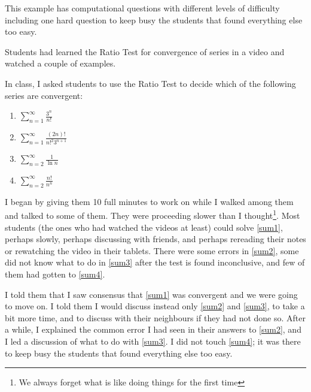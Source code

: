 \documentclass[11pt]{article}
\begin{document}
	\begin{example}
		This example has computational questions with different levels of difficulty
		including one hard question to keep busy the students that found everything else
		too easy.
		\begin{background}
			Students had learned the Ratio Test for convergence of series in a video and
			watched a couple of examples.
		\end{background}
		\begin{question}
			In class, I asked students to use the Ratio Test to decide which of the
			following series are convergent:
			\begin{center}
				\begin{minipage}{0.7\textwidth}
					\begin{multicols}{2}
						\begin{enumerate}[label=(\arabic{*})]
							\item ${\displaystyle \sum_{n=1}^\infty \frac{3^{n}}{n!}}$ \label{sum1}

							\item ${\displaystyle \sum_{n=1}^\infty \frac{(2n)!}{n!^{2} 3^{n+1}}}$
								\label{sum2}

							\item ${\displaystyle \sum_{n=2}^\infty \frac{1}{\ln n}}$ \label{sum3}

							\item ${\displaystyle \sum_{n=2}^\infty \frac{n!}{n^{n}}}$ \label{sum4}
						\end{enumerate}
					\end{multicols}
				\end{minipage}
			\end{center}

			\vspace{1mm}
		\end{question}
		\begin{comments}
			I began by giving them 10 full minutes to work on while I walked among them
			and talked to some of them. They were proceeding slower than I thought\footnote{We
			always forget what is like doing things for the first time}. Most students
			(the ones who had watched the videos at least) could solve \ref{sum1}, perhaps
			slowly, perhaps discussing with friends, and perhaps rereading their notes
			or rewatching the video in their tablets. There were some errors in
			\ref{sum2}, some did not know what to do in \ref{sum3} after the test is found
			inconclusive, and few of them had gotten to \ref{sum4}.

			{\baselineskip I told them that I saw consensus that \ref{sum1} was convergent and we were going to move on. I told them I would discuss instead only \ref{sum2} and \ref{sum3}, to take a bit more time, and to discuss with their neighbours if they had not done so. After a while, I explained the common error I had seen in their answers to \ref{sum2}, and I led a discussion of what to do with \ref{sum3}. I did not touch \ref{sum4}; it was there to keep busy the students that found everything else too easy. }
		\end{comments}
	\end{example}
\end{document}
